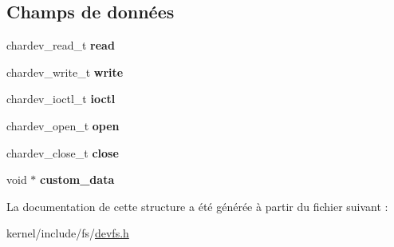 \subsection*{Champs de données}
\begin{DoxyCompactItemize}
\item 
\hypertarget{structchardev__interfaces_afeba560360e6a5dfff549d78c220b68b}{chardev\-\_\-read\-\_\-t {\bfseries read}}\label{structchardev__interfaces_afeba560360e6a5dfff549d78c220b68b}

\item 
\hypertarget{structchardev__interfaces_a6f70961f2f888de24d500d50bae85a3f}{chardev\-\_\-write\-\_\-t {\bfseries write}}\label{structchardev__interfaces_a6f70961f2f888de24d500d50bae85a3f}

\item 
\hypertarget{structchardev__interfaces_a9e5903e31e8e5ab21e9abc4b3a844e4a}{chardev\-\_\-ioctl\-\_\-t {\bfseries ioctl}}\label{structchardev__interfaces_a9e5903e31e8e5ab21e9abc4b3a844e4a}

\item 
\hypertarget{structchardev__interfaces_a7962a67531ea5263a2f837c36fb18dc0}{chardev\-\_\-open\-\_\-t {\bfseries open}}\label{structchardev__interfaces_a7962a67531ea5263a2f837c36fb18dc0}

\item 
\hypertarget{structchardev__interfaces_a9cba421c4dddc041e4b5029d011dbbd9}{chardev\-\_\-close\-\_\-t {\bfseries close}}\label{structchardev__interfaces_a9cba421c4dddc041e4b5029d011dbbd9}

\item 
\hypertarget{structchardev__interfaces_a9b6b938d76fe7e20c93da8a032a42ad7}{void $\ast$ {\bfseries custom\-\_\-data}}\label{structchardev__interfaces_a9b6b938d76fe7e20c93da8a032a42ad7}

\end{DoxyCompactItemize}


La documentation de cette structure a été générée à partir du fichier suivant \-:\begin{DoxyCompactItemize}
\item 
kernel/include/fs/\hyperlink{devfs_8h}{devfs.\-h}\end{DoxyCompactItemize}
